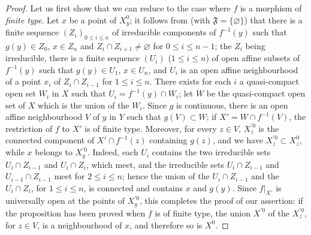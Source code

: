 \begin{proof}
Let us first show that we can reduce to the case where $f$ is a morphism of \emph{finite type}.
Let $x$ be a point of $X_y^0$; it follows from  (with $\mathfrak{F}=\{\varnothing\}$) that there is a finite sequence $(Z_i)_{0\leq i\leq n}$ of irreducible components of $f^{-1}(y)$ such that $g(y)\in Z_0$, $x\in Z_n$ and $Z_i\cap Z_{i+1}\neq\varnothing$ for $0\leq i\leq n-1$; the $Z_i$ being irreducible, there is a finite sequence $(U_i)$ ($1\leq i\leq n$) of open affine subsets of $f^{-1}(y)$ such that $g(y)\in U_1$, $x\in U_n$, and $U_i$ is an open affine neighbourhood of a point $x_i$ of $Z_i\cap Z_{i-1}$ for $1\leq i\leq n$.
There exists for each $i$ a quasi-compact open set $W_i$ in $X$ such that $U_i=f^{-1}(y)\cap W_i$; let $W$ be the quasi-compact open set of $X$ which is the union of the $W_i$.
Since $g$ is continuous, there is an open affine neighbourhood $V$ of $y$ in $Y$ such that $g(V)\subset W$; if $X'=W\cap f^{-1}(V)$, the restriction of $f$ to $X'$ is of finite type. Moreover, for every $z\in V$, $X_z^{\prime 0}$ is the connected component of $X'\cap f^{-1}(z)$ containing $g(z)$, and we have $X_z^{\prime 0}\subset X_z^0$, while $x$ belongs to $X_y^{\prime 0}$.
Indeed, each $U_i$ contains the two irreducible sets $U_i\cap Z_{i-1}$
and $U_i\cap Z_i$, which meet, and the irreducible sets $U_i\cap Z_{i-1}$ and $U_{i-1}\cap Z_{i-1}$ meet for $2\leq i\leq n$; hence the union of the $U_i\cap Z_{i-1}$ and the $U_i\cap Z_i$, for $1\leq i\leq n$, is connected and contains $x$ and $g(y)$.
Since $f|_{X'}$ is universally open at the points of $X_y^{\prime 0}$, this completes the proof of our assertion: if the proposition has been proved when $f$ is of finite type, the union $X^{\prime 0}$ of the $X_z^{\prime 0}$, for $z\in V$, is a neighbourhood of $x$, and therefore so is $X^0$.


\end{proof}
